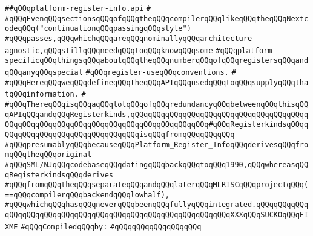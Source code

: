 \label{src/lib/compiler/back/low/main/nextcode/platform-register-info.api}
\verb|##qQQqplatform-register-info.api|\newline
\verb|#|\newline
\verb|#qQQqEvenqQQqsectionsqQQqofqQQqtheqQQqcompilerqQQqlikeqQQqtheqQQqNextcodeqQQq("continuationqQQqpassingqQQqstyle")|\newline
\verb|#qQQqpasses,qQQqwhichqQQqareqQQqnominallyqQQqarchitecture-agnostic,qQQqstillqQQqneedqQQqtoqQQqknowqQQqsome|\newline
\verb|#qQQqplatform-specificqQQqthingsqQQqaboutqQQqtheqQQqnumberqQQqofqQQqregistersqQQqandqQQqanyqQQqspecial|\newline
\verb|#qQQqregister-useqQQqconventions.|\newline
\verb|#|\newline
\verb|#qQQqHereqQQqweqQQqdefineqQQqtheqQQqAPIqQQqusedqQQqtoqQQqsupplyqQQqthatqQQqinformation.|\newline
\verb|#|\newline
\verb|#qQQqThereqQQqisqQQqaqQQqlotqQQqofqQQqredundancyqQQqbetweenqQQqthisqQQqAPIqQQqandqQQqRegisterkinds,qQQqqQQqqQQqqQQqqQQqqQQqqQQqqQQqqQQqqQQqqQQqqQQqqQQqqQQqqQQqqQQqqQQqqQQqqQQqqQQqqQQqqQQq#qQQqRegisterkindsqQQqqQQqqQQqqQQqqQQqqQQqqQQqqQQqqQQqisqQQqfromqQQqqQQqqQQq|\newline
\verb|#qQQqpresumablyqQQqbecauseqQQqPlatform_Register_InfoqQQqderivesqQQqfromqQQqtheqQQqoriginal|\newline
\verb|#qQQqSML/NJqQQqcodebaseqQQqdatingqQQqbackqQQqtoqQQq1990,qQQqwhereasqQQqRegisterkindsqQQqderives|\newline
\verb|#qQQqfromqQQqtheqQQqseparateqQQqandqQQqlaterqQQqMLRISCqQQqprojectqQQq(==qQQqcompilerqQQqbackendqQQqlowhalf),|\newline
\verb|#qQQqwhichqQQqhasqQQqneverqQQqbeenqQQqfullyqQQqintegrated.qQQqqQQqqQQqqQQqqQQqqQQqqQQqqQQqqQQqqQQqqQQqqQQqqQQqqQQqqQQqqQQqXXXqQQqSUCKOqQQqFIXME|\newline
\newline
\verb|#qQQqCompiledqQQqby:|\newline
\verb|#qQQqqQQqqQQqqQQqqQQq|\newline
\newline
\newline
\newline
\newline
